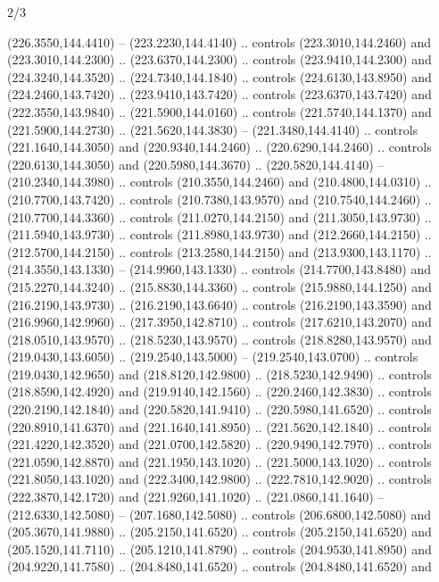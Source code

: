 \begin{flagdescription}{2/3}
\begin{scope}[xshift=0.5\flaglength,yshift=0.5\flagwidth,scale=\flagwidth/259.2]
\begin{scope}[y=0.8pt, x=0.8pt, yscale=-1,shift={(-243,-162)}]
      (226.3550,144.4410) -- (223.2230,144.4140) .. controls (223.3010,144.2460) and
      (223.3010,144.2300) .. (223.6370,144.2300) .. controls (223.9410,144.2300) and
      (224.3240,144.3520) .. (224.7340,144.1840) .. controls (224.6130,143.8950) and
      (224.2460,143.7420) .. (223.9410,143.7420) .. controls (223.6370,143.7420) and
      (222.3550,143.9840) .. (221.5900,144.0160) .. controls (221.5740,144.1370) and
      (221.5900,144.2730) .. (221.5620,144.3830) -- (221.3480,144.4140) .. controls
      (221.1640,144.3050) and (220.9340,144.2460) .. (220.6290,144.2460) .. controls
      (220.6130,144.3050) and (220.5980,144.3670) .. (220.5820,144.4140) --
      (210.2340,144.3980) .. controls (210.3550,144.2460) and (210.4800,144.0310) ..
      (210.7700,143.7420) .. controls (210.7380,143.9570) and (210.7540,144.2460) ..
      (210.7700,144.3360) .. controls (211.0270,144.2150) and (211.3050,143.9730) ..
      (211.5940,143.9730) .. controls (211.8980,143.9730) and (212.2660,144.2150) ..
      (212.5700,144.2150) .. controls (213.2580,144.2150) and (213.9300,143.1170) ..
      (214.3550,143.1330) -- (214.9960,143.1330) .. controls (214.7700,143.8480) and
      (215.2270,144.3240) .. (215.8830,144.3360) .. controls (215.9880,144.1250) and
      (216.2190,143.9730) .. (216.2190,143.6640) .. controls (216.2190,143.3590) and
      (216.9960,142.9960) .. (217.3950,142.8710) .. controls (217.6210,143.2070) and
      (218.0510,143.9570) .. (218.5230,143.9570) .. controls (218.8280,143.9570) and
      (219.0430,143.6050) .. (219.2540,143.5000) -- (219.2540,143.0700) .. controls
      (219.0430,142.9650) and (218.8120,142.9800) .. (218.5230,142.9490) .. controls
      (218.8590,142.4920) and (219.9140,142.1560) .. (220.2460,142.3830) .. controls
      (220.2190,142.1840) and (220.5820,141.9410) .. (220.5980,141.6520) .. controls
      (220.8910,141.6370) and (221.1640,141.8950) .. (221.5620,142.1840) .. controls
      (221.4220,142.3520) and (221.0700,142.5820) .. (220.9490,142.7970) .. controls
      (221.0590,142.8870) and (221.1950,143.1020) .. (221.5000,143.1020) .. controls
      (221.8050,143.1020) and (222.3400,142.9800) .. (222.7810,142.9020) .. controls
      (222.3870,142.1720) and (221.9260,141.1020) .. (221.0860,141.1640) --
      (212.6330,142.5080) -- (207.1680,142.5080) .. controls (206.6800,142.5080) and
      (205.3670,141.9880) .. (205.2150,141.6520) .. controls (205.2150,141.6520) and
      (205.1520,141.7110) .. (205.1210,141.8790) .. controls (204.9530,141.8950) and
      (204.9220,141.7580) .. (204.8480,141.6520) .. controls (204.8480,141.6520) and

\end{scope}
\end{scope}
\end{flagdescription}
